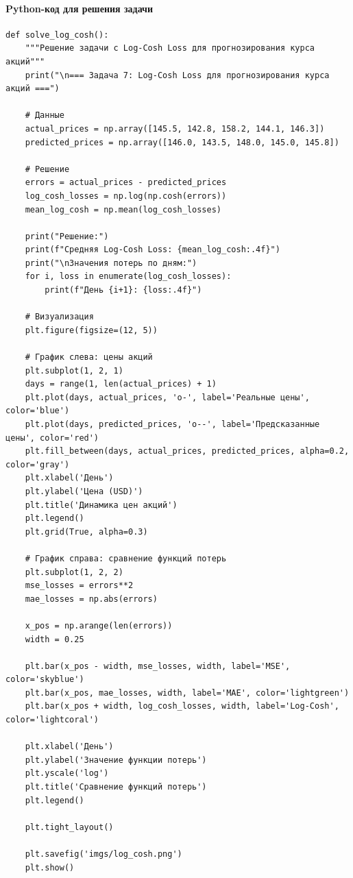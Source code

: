 \documentclass[12pt]{article}
\theoremstyle{definition}
\theoremstyle{definition}
\theoremstyle{definition}
\theoremstyle{remark}
\theoremstyle{remark}
\begin{document}
\paragraph*{Python-код для решения задачи}
\begin{verbatim}
def solve_log_cosh():
    """Решение задачи с Log-Cosh Loss для прогнозирования курса акций"""
    print("\n=== Задача 7: Log-Cosh Loss для прогнозирования курса акций ===")
    
    # Данные
    actual_prices = np.array([145.5, 142.8, 158.2, 144.1, 146.3])
    predicted_prices = np.array([146.0, 143.5, 148.0, 145.0, 145.8])
    
    # Решение
    errors = actual_prices - predicted_prices
    log_cosh_losses = np.log(np.cosh(errors))
    mean_log_cosh = np.mean(log_cosh_losses)
    
    print("Решение:")
    print(f"Средняя Log-Cosh Loss: {mean_log_cosh:.4f}")
    print("\nЗначения потерь по дням:")
    for i, loss in enumerate(log_cosh_losses):
        print(f"День {i+1}: {loss:.4f}")
    
    # Визуализация
    plt.figure(figsize=(12, 5))
    
    # График слева: цены акций
    plt.subplot(1, 2, 1)
    days = range(1, len(actual_prices) + 1)
    plt.plot(days, actual_prices, 'o-', label='Реальные цены', color='blue')
    plt.plot(days, predicted_prices, 'o--', label='Предсказанные цены', color='red')
    plt.fill_between(days, actual_prices, predicted_prices, alpha=0.2, color='gray')
    plt.xlabel('День')
    plt.ylabel('Цена (USD)')
    plt.title('Динамика цен акций')
    plt.legend()
    plt.grid(True, alpha=0.3)
    
    # График справа: сравнение функций потерь
    plt.subplot(1, 2, 2)
    mse_losses = errors**2
    mae_losses = np.abs(errors)
    
    x_pos = np.arange(len(errors))
    width = 0.25
    
    plt.bar(x_pos - width, mse_losses, width, label='MSE', color='skyblue')
    plt.bar(x_pos, mae_losses, width, label='MAE', color='lightgreen')
    plt.bar(x_pos + width, log_cosh_losses, width, label='Log-Cosh', color='lightcoral')
    
    plt.xlabel('День')
    plt.ylabel('Значение функции потерь')
    plt.yscale('log')
    plt.title('Сравнение функций потерь')
    plt.legend()
    
    plt.tight_layout()
    
    plt.savefig('imgs/log_cosh.png')
    plt.show()
\end{verbatim}
\end{document}

